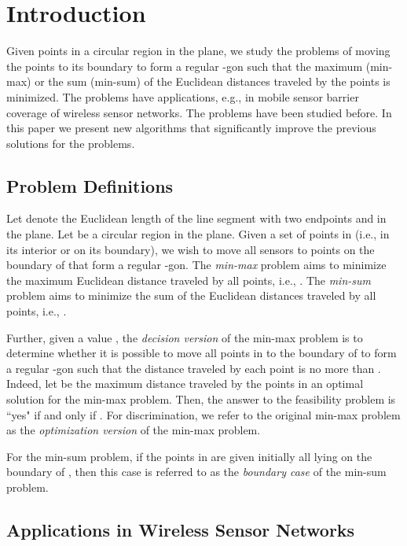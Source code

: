 \documentclass[11pt]{article}
\begin{document}
\section{Introduction}

Given  points in a circular region  in the plane, we study the problems of
moving the  points to its boundary to form a regular -gon such that
the maximum (min-max) or the sum (min-sum) of the Euclidean
distances traveled by the points is minimized. The problems have
applications, e.g., in mobile sensor barrier coverage of wireless
sensor networks. The problems have
been studied before. In this paper we present new algorithms that significantly
improve the previous solutions for the problems.

\subsection{Problem Definitions}

Let  denote the Euclidean length of the line segment with two
endpoints  and  in the plane. Let  be a circular region in
the plane. Given a set of  points  in
 (i.e., in its interior or on its boundary), we wish to move all sensors to
 points  on the boundary of  that
form a regular -gon. The {\em min-max} problem aims to minimize
the maximum Euclidean distance traveled by all points, i.e.,
. The {\em min-sum}
problem aims to minimize the sum of the Euclidean distances traveled
by all points, i.e., .

Further, given a value , the {\em decision version} of
the min-max problem is to determine whether it is possible to move all points in
 to the boundary of  to form a regular -gon such that the distance
traveled by each point is no more than . Indeed,
let  be the maximum distance traveled by the points in
an optimal solution for the min-max problem. Then, the answer to the
feasibility problem is ``yes" if and only if . For discrimination, we refer to the original min-max
problem as the {\em optimization version} of the min-max problem.

For the min-sum problem, if the points in  are given initially all lying on the
boundary of , then this case is referred to as the {\em boundary
case} of the min-sum problem.

\subsection{Applications in Wireless Sensor Networks}
\end{document}

